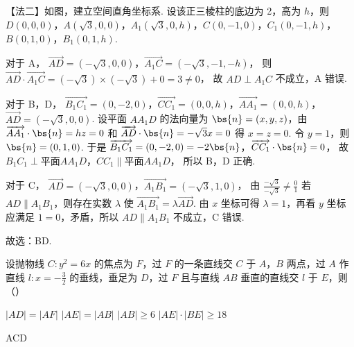 \documentclass[UTF8,a4paper,oneside,11pt]{ctexbook}
\begin{document}
\begin{solution}
【法二】如图，建立空间直角坐标系. 设该正三棱柱的底边为 2，高为 \(h\)，则
\(D(0,0,0)\)，\(A(\sqrt{3},0,0)\)，\(A_1(\sqrt{3},0,h)\)，\(C(0,-1,0)\)，\(C_1(0,-1,h)\)，\(B(0,1,0)\)，\(B_1(0,1,h)\).


对于 A，
\(\overrightarrow{AD} = (-\sqrt{3},0,0)\)，\(\overrightarrow{A_1C} = (-\sqrt{3},-1,-h)\)，
则
\(\overrightarrow{AD} \cdot \overrightarrow{A_1C} = (-\sqrt{3}) \times (-\sqrt{3}) + 0 = 3 \neq 0\)，
故 \(AD \perp A_1C\) 不成立，A 错误.

对于 B，D，
\(\overrightarrow{B_1C_1} = (0,-2,0)\)，\(\overrightarrow{CC_1} = (0,0,h)\)，\(\overrightarrow{AA_1} = (0,0,h)\)，\(\overrightarrow{AD} = (-\sqrt{3},0,0)\).
设平面 \(AA_1D\) 的法向量为 \(\bs{n} = (x,y,z)\)，由 \(\overrightarrow{AA_1} \cdot \bs{n} = hz = 0\) 和 \(\overrightarrow{AD} \cdot \bs{n} = -\sqrt{3}x = 0\) 得 \(x = z = 0\). 令 \(y = 1\)，则 \(\bs{n} = (0,1,0)\).
于是
\(\overrightarrow{B_1C_1} = (0,-2,0) = -2\bs{n}\)，\(\overrightarrow{CC_1} \cdot \bs{n} = 0\)，
故
\(B_1C_1 \perp \text{平面} AA_1D\)，\(CC_1 \parallel \text{平面} AA_1D\)，
所以 B，D 正确.

对于 C，
\(\overrightarrow{AD} = (-\sqrt{3},0,0)\)，\(\overrightarrow{A_1B_1} = (-\sqrt{3},1,0)\)，
由
\(\frac{-\sqrt{3}}{-\sqrt{3}} \neq \frac{0}{1}\)
若 \(AD \parallel A_1B_1\)，则存在实数 \(\lambda\) 使
\(\overrightarrow{A_1B_1}=\lambda \overrightarrow{AD}\).
由 \(x\) 坐标可得 \(\lambda=1\)，再看 \(y\) 坐标应满足 \(1=0\)，矛盾，所以 \(AD \parallel A_1B_1\) 不成立，C 错误.

故选：BD.
\end{solution}

\begin{problem}
设抛物线 \(C: y^2 = 6x\) 的焦点为 \(F\)，过 \(F\) 的一条直线交 \(C\) 于 \(A\)，\(B\) 两点，过 \(A\) 作直线 \(l: x = -\frac{3}{2}\) 的垂线，垂足为 \(D\)，过 \(F\) 且与直线 \(AB\) 垂直的直线交 \(l\) 于 \(E\)，则（\quad）

\choices
    {\(|AD| = |AF|\)}
    {\(|AE| = |AB|\)}
    {\(|AB| \ge 6\)}
    {\(|AE| \cdot |BE| \ge 18\)}
\end{problem}

\begin{answer}
ACD
\end{answer}
\end{document}
